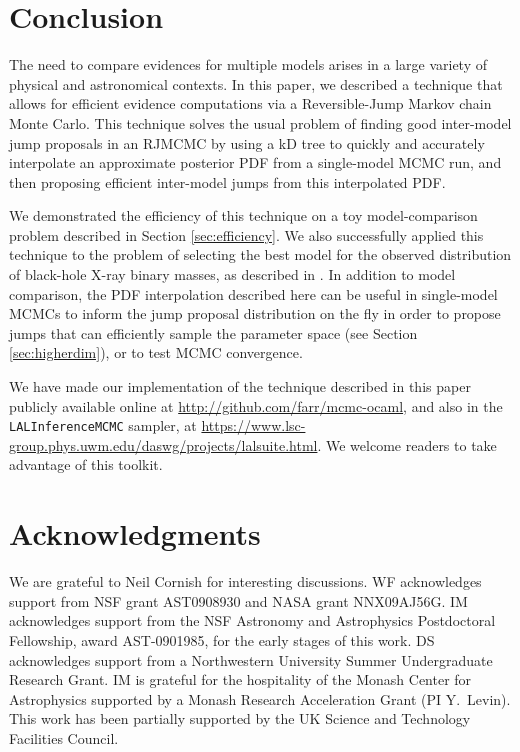 \documentclass{rsos}
\begin{document}
\section{Conclusion}
\label{sec:conclusion}

The need to compare evidences for multiple models arises in a large
variety of physical and astronomical contexts.  In this paper, we
described a technique that allows for efficient evidence
computations via a Reversible-Jump Markov chain Monte Carlo.  This
technique solves the usual problem of finding good inter-model jump
proposals in an RJMCMC by using a kD tree to quickly and accurately
interpolate an approximate posterior PDF from a single-model MCMC run,
and then proposing efficient inter-model
jumps from this interpolated PDF.

We demonstrated the efficiency of this technique on a toy
model-comparison problem described in Section \ref{sec:efficiency}.
We also successfully applied this technique to the problem of
selecting the best model for the observed distribution of black-hole
X-ray binary masses, as described in \cite{Farr2010}.  In addition to
model comparison, the PDF interpolation described here can be useful
in single-model MCMCs to inform the jump proposal distribution on the fly in order to propose jumps that can efficiently sample the parameter space (see Section \ref{sec:higherdim}), or to test MCMC convergence. 

We have made our implementation of the technique described in this
paper publicly available online at
\url{http://github.com/farr/mcmc-ocaml}, and also in the
\texttt{LALInferenceMCMC} sampler, at
\url{https://www.lsc-group.phys.uwm.edu/daswg/projects/lalsuite.html}.
We welcome readers to take advantage of this toolkit.


\section*{Acknowledgments}

We are grateful to Neil Cornish for interesting discussions.  WF acknowledges support
from NSF grant AST0908930 and NASA grant NNX09AJ56G.  IM
acknowledges support from the NSF Astronomy and Astrophysics
Postdoctoral Fellowship, award AST-0901985, for the early stages of this work.  
 DS acknowledges
support from a Northwestern University Summer Undergraduate Research Grant. IM is grateful for the hospitality of the Monash Center for Astrophysics supported by a Monash Research Acceleration Grant (PI Y.~Levin).  This work has been partially supported by the UK Science and Technology Facilities Council.

\section*{}


%
\end{document}
